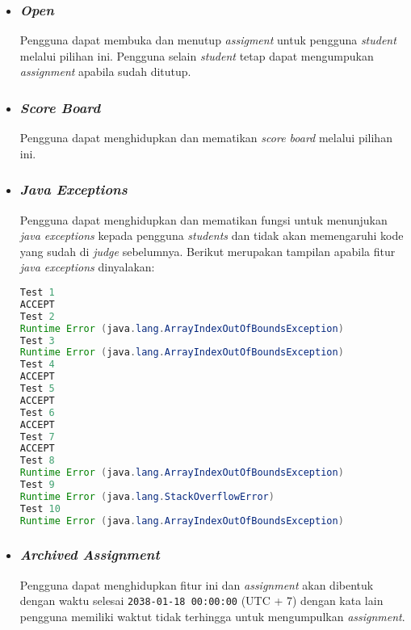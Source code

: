 \begin{itemize}
\item \subsubsection{\textit{Open}}
Pengguna dapat membuka dan menutup \textit{assigment} untuk pengguna \textit{student} melalui pilihan ini. Pengguna selain \textit{student} tetap dapat mengumpukan \textit{assignment} apabila sudah ditutup.

\item \subsubsection{\textit{Score Board}}
Pengguna dapat menghidupkan dan mematikan \textit{score board} melalui pilihan ini.

\item \subsubsection{\textit{Java Exceptions}}
Pengguna dapat menghidupkan dan mematikan fungsi untuk menunjukan \textit{java exceptions} kepada pengguna \textit{students} dan tidak akan memengaruhi kode yang sudah di \textit{judge} sebelumnya. Berikut merupakan tampilan apabila fitur \textit{java exceptions} dinyalakan:
\begin{lstlisting}[language=Java, caption=Contoh tampilan fitur \textit{Java Exceptions}, label=kode:javaexceptions]
Test 1
ACCEPT
Test 2
Runtime Error (java.lang.ArrayIndexOutOfBoundsException)
Test 3
Runtime Error (java.lang.ArrayIndexOutOfBoundsException)
Test 4
ACCEPT
Test 5
ACCEPT
Test 6
ACCEPT
Test 7
ACCEPT
Test 8
Runtime Error (java.lang.ArrayIndexOutOfBoundsException)
Test 9
Runtime Error (java.lang.StackOverflowError)
Test 10
Runtime Error (java.lang.ArrayIndexOutOfBoundsException)
\end{lstlisting}

\item \subsubsection{\textit{Archived Assignment}}
Pengguna dapat menghidupkan fitur ini dan \textit{assignment} akan dibentuk dengan waktu selesai \verb|2038-01-18 00:00:00| (UTC + 7) dengan kata lain pengguna memiliki waktut tidak terhingga untuk mengumpulkan \textit{assignment}.


\end{itemize}
